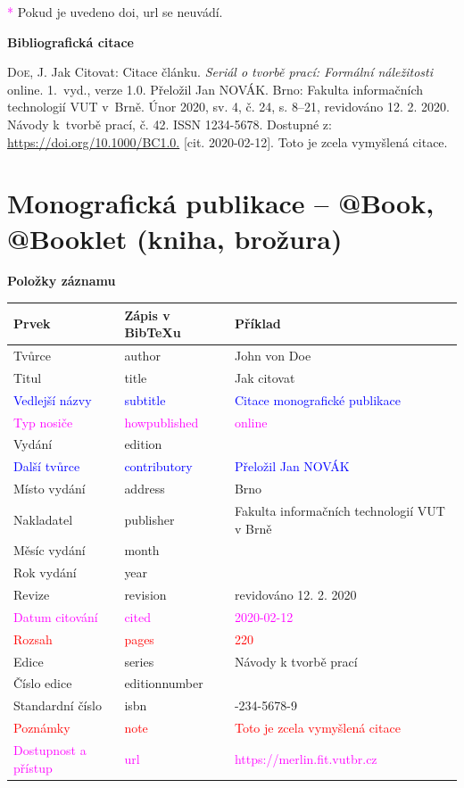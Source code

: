 \bigskip
\textcolor{magenta}{*} Pokud je uvedeno doi, url se neuvádí.
\bigskip

\noindent \textbf{Bibliografická citace}

\medskip

\noindent \textsc{Doe}, J. Jak Citovat: Citace článku. \textit{Seriál o tvorbě prací: Formální náležitosti} online. 1.~vyd., verze 1.0. Přeložil Jan NOVÁK. Brno: Fakulta informačních technologií VUT v~Brně. Únor 2020, sv. 4, č. 24, s. 8–21, revidováno 12. 2. 2020. Návody k~tvorbě prací, č. 42. ISSN 1234-5678. Dostupné z: \url{https://doi.org/10.1000/BC1.0.} [cit. 2020-02-12]. Toto je zcela vymyšlená citace.

\newpage
\section*{Monografická publikace -- @Book, @Booklet (kniha, brožura)}
\label{pr-monografie}
\noindent \textbf{Položky záznamu}

\medskip

\begin{tabularx}{0.95\linewidth}{X X >{\raggedright\arraybackslash}X}
    Prvek & Zápis v BibTeXu & Příklad\\\hline
    Tvůrce & author & John von Doe\\
    Titul & title & Jak citovat\\
    \textcolor{blue}{Vedlejší názvy} & \textcolor{blue}{subtitle} & \textcolor{blue}{Citace monografické publikace}\\
    \textcolor{magenta}{Typ nosiče} & \textcolor{magenta}{howpublished} & \textcolor{magenta}{online}\\
    Vydání & edition & 1\\
    \textcolor{blue}{Další tvůrce} & \textcolor{blue}{contributory} & \textcolor{blue}{Přeložil Jan NOVÁK}\\
    Místo vydání & address & Brno\\
    Nakladatel & publisher & Fakulta informačních technologií VUT v Brně\\
    Měsíc vydání & month & 2\\
    Rok vydání & year & 2020\\
    Revize & revision & revidováno 12. 2. 2020\\
    \textcolor{magenta}{Datum citování} & \textcolor{magenta}{cited} & \textcolor{magenta}{2020-02-12}\\
    \textcolor{red}{Rozsah} & \textcolor{red}{pages} & \textcolor{red}{220}\\
    Edice & series & Návody k tvorbě prací\\
    Číslo edice & editionnumber & 2\\
    Standardní číslo & isbn & 01-234-5678-9\\
    \textcolor{red}{Poznámky} & \textcolor{red}{note} & \textcolor{red}{Toto je zcela vymyšlená citace}\\
    \textcolor{magenta}{Dostupnost a přístup} & \textcolor{magenta}{url} & \textcolor{magenta}{https://merlin.fit.vutbr.cz}\\
\end{tabularx}

